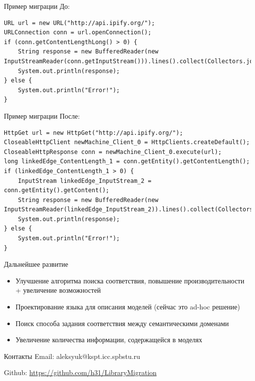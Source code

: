 \documentclass[12pt]{beamer}
\begin{document}
\begin{frame}[fragile]{Пример миграции}
До:
\begin{lstlisting}
URL url = new URL("http://api.ipify.org/");
URLConnection conn = url.openConnection();
if (conn.getContentLengthLong() > 0) {
    String response = new BufferedReader(new InputStreamReader(conn.getInputStream())).lines().collect(Collectors.joining("\n"));
    System.out.println(response);
} else {
    System.out.println("Error!");
}
\end{lstlisting}
\end{frame}

\begin{frame}[fragile]{Пример миграции}
После:
\begin{lstlisting}[basicstyle=\ttfamily\scriptsize]
HttpGet url = new HttpGet("http://api.ipify.org/");
CloseableHttpClient newMachine_Client_0 = HttpClients.createDefault();
CloseableHttpResponse conn = newMachine_Client_0.execute(url);
long linkedEdge_ContentLength_1 = conn.getEntity().getContentLength();
if (linkedEdge_ContentLength_1 > 0) {
    InputStream linkedEdge_InputStream_2 = conn.getEntity().getContent();
    String response = new BufferedReader(new InputStreamReader(linkedEdge_InputStream_2)).lines().collect(Collectors.joining("\n"));
    System.out.println(response);
} else {
    System.out.println("Error!");
}
\end{lstlisting}
\end{frame}

{
\begin{frame}{Дальнейшее развитие}
	\begin{mybox}[]
	\begin{itemize}
		\item Улучшение алгоритма поиска соответствия, повышение производительности + увеличение возможностей
		\item Проектирование языка для описания моделей (сейчас это ad-hoc решение)
		\item Поиск способа задания соответствия между семантическими доменами
		\item Увеличение количества информации, содержащейся в моделях
	\end{itemize}
	\end{mybox}
\end{frame}
}

\begin{frame}{Контакты}
	Email: aleksyuk@kspt.icc.spbstu.ru
	
	Github: \url{https://github.com/h31/LibraryMigration}
\end{frame}
\end{document}
